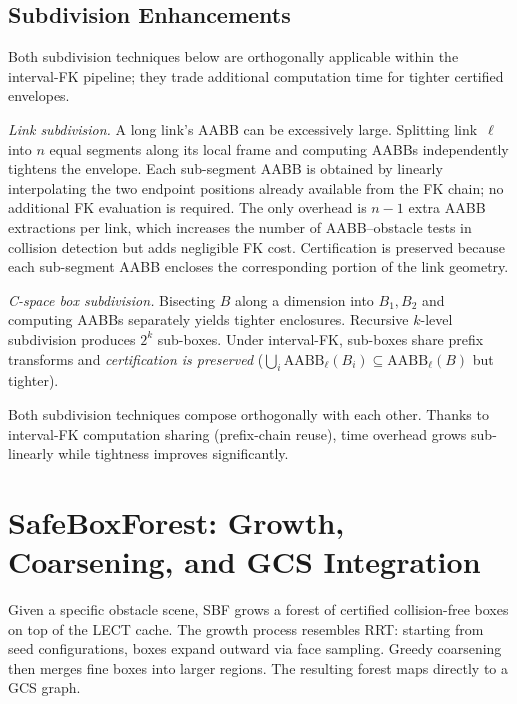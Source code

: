 \documentclass[letterpaper, conference]{IEEEtran}
\newcommand{\AABB}{\text{AABB}}
\begin{document}
\subsection{Subdivision Enhancements}\label{sec:subdivision}

Both subdivision techniques below are orthogonally applicable within the
interval-FK pipeline; they trade additional computation time for tighter
certified envelopes.

\emph{Link subdivision.}
A long link's AABB can be excessively large.
Splitting link~$\ell$ into $n$ equal segments along its local frame and
computing AABBs independently tightens the envelope.
Each sub-segment AABB is obtained by linearly interpolating the two
endpoint positions already available from the FK chain; no additional
FK evaluation is required.
The only overhead is $n{-}1$ extra AABB extractions per link, which
increases the number of AABB--obstacle tests in collision detection
but adds negligible FK cost.
Certification is preserved because each sub-segment AABB encloses
the corresponding portion of the link geometry.

\emph{C-space box subdivision.}
Bisecting $B$ along a dimension into $B_1,B_2$ and computing AABBs
separately yields tighter enclosures.
Recursive $k$-level subdivision produces $2^k$ sub-boxes.
Under interval-FK, sub-boxes share prefix transforms and \emph{certification is
preserved}
($\bigcup_i \AABB_\ell(B_i) \subseteq \AABB_\ell(B)$ but tighter).

Both subdivision techniques compose orthogonally with each other.
Thanks to interval-FK computation sharing (prefix-chain reuse), time overhead
grows sub-linearly while tightness improves significantly.


\section{SafeBoxForest: Growth, Coarsening, and GCS Integration}
\label{sec:sbf}

Given a specific obstacle scene, SBF grows a forest of certified
collision-free boxes on top of the LECT cache.
The growth process resembles RRT: starting from seed configurations,
boxes expand outward via face sampling.
Greedy coarsening then merges fine boxes into larger regions.
The resulting forest maps directly to a GCS graph.
\end{document}
